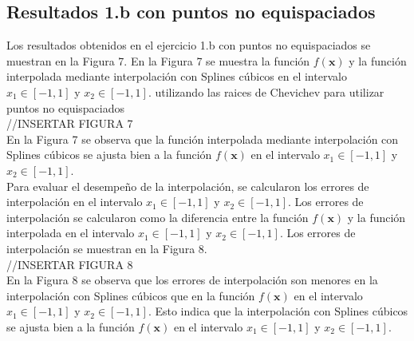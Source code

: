 \subsection{Resultados 1.b con puntos no equispaciados}
Los resultados obtenidos en el ejercicio 1.b con puntos no equispaciados se muestran en la Figura 7. En la Figura 7 se muestra la función $f(\textbf{x})$ y la función interpolada mediante interpolación con Splines cúbicos en el intervalo $x_1 \in [-1, 1]$ y $x_2 \in [-1, 1]$. utilizando las raices de Chevichev para utilizar puntos no equispaciados\\
//INSERTAR FIGURA 7\\
En la Figura 7 se observa que la función interpolada mediante interpolación con Splines cúbicos se ajusta bien a la función $f(\textbf{x})$ en el intervalo $x_1 \in [-1, 1]$ y $x_2 \in [-1, 1]$.\\
Para evaluar el desempeño de la interpolación, se calcularon los errores de interpolación en el intervalo $x_1 \in [-1, 1]$ y $x_2 \in [-1, 1]$. Los errores de interpolación se calcularon como la diferencia entre la función $f(\textbf{x})$ y la función interpolada en el intervalo $x_1 \in [-1, 1]$ y $x_2 \in [-1, 1]$. Los errores de interpolación se muestran en la Figura 8.\\
//INSERTAR FIGURA 8\\
En la Figura 8 se observa que los errores de interpolación son menores en la interpolación con Splines cúbicos que en la función $f(\textbf{x})$ en el intervalo $x_1 \in [-1, 1]$ y $x_2 \in [-1, 1]$. Esto indica que la interpolación con Splines cúbicos se ajusta bien a la función $f(\textbf{x})$ en el intervalo $x_1 \in [-1, 1]$ y $x_2 \in [-1, 1]$.\\


